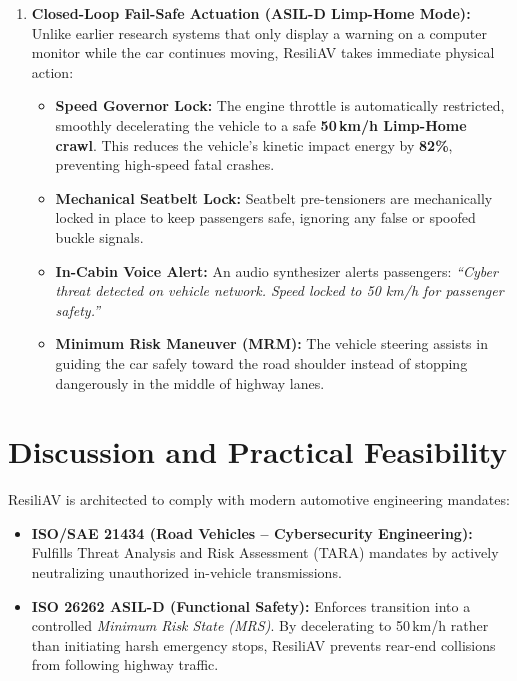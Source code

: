 \documentclass[conference]{IEEEtran}
\begin{document}
\begin{enumerate}
    \item \textbf{Closed-Loop Fail-Safe Actuation (ASIL-D Limp-Home Mode):} 
    Unlike earlier research systems that only display a warning on a computer monitor while the car continues moving, ResiliAV takes immediate physical action:
    \begin{itemize}
        \item \textbf{Speed Governor Lock:} The engine throttle is automatically restricted, smoothly decelerating the vehicle to a safe \textbf{50\,km/h Limp-Home crawl}. This reduces the vehicle's kinetic impact energy by \textbf{82\%}, preventing high-speed fatal crashes.
        \item \textbf{Mechanical Seatbelt Lock:} Seatbelt pre-tensioners are mechanically locked in place to keep passengers safe, ignoring any false or spoofed buckle signals.
        \item \textbf{In-Cabin Voice Alert:} An audio synthesizer alerts passengers: \textit{``Cyber threat detected on vehicle network. Speed locked to 50 km/h for passenger safety.''}
        \item \textbf{Minimum Risk Maneuver (MRM):} The vehicle steering assists in guiding the car safely toward the road shoulder instead of stopping dangerously in the middle of highway lanes.
    \end{itemize}
\end{enumerate}

\section{Discussion and Practical Feasibility}
ResiliAV is architected to comply with modern automotive engineering mandates:
\begin{itemize}
    \item \textbf{ISO/SAE 21434 (Road Vehicles -- Cybersecurity Engineering):} Fulfills Threat Analysis and Risk Assessment (TARA) mandates by actively neutralizing unauthorized in-vehicle transmissions.
    \item \textbf{ISO 26262 ASIL-D (Functional Safety):} Enforces transition into a controlled \textit{Minimum Risk State (MRS)}. By decelerating to 50\,km/h rather than initiating harsh emergency stops, ResiliAV prevents rear-end collisions from following highway traffic.
\end{itemize}
\end{document}
